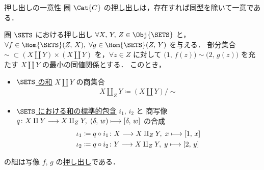 \documentclass[geometry_main]{subfiles}
\begin{document}
\begin{myprop}[]{押し出しの一意性}
	圏 $\Cat{C}$ の\hyperref[def:pushout]{押し出し}は，存在すれば\hyperref[def:iso]{同型}を除いて一意である．
\end{myprop}

\begin{myprop}[label=prop:pushout-sets]{圏 $\SETS$ における押し出し}
	$\forall X,\, Y,\, Z \in \Obj{\SETS}$ と，$\forall f \in \Hom{\SETS}(Z,\, X),\; \forall g \in \Hom{\SETS}(Z,\, Y)$ を与える．
	部分集合 $\sim\; \subset (X \amalg Y) \times (X \amalg Y)$ を，$\forall z \in Z$ に対して $\bigl(1,\, f(z)\bigr) \sim \bigl(2,\, g(z)\bigr)$ を充たす $X \amalg Y$ の最小の同値関係とする．
	このとき，
	\begin{itemize}
		\item \hyperref[prop:sum-sets]{$\SETS$ の和} $X \amalg Y$ の商集合
		\begin{align}
			X \amalg_Z Y \coloneqq (X \amalg Y)/{\sim}
		\end{align}
		\item \hyperref[prop:sum-sets]{$\SETS$ における和の標準的包含} $i_1,\, i_2$ と
		商写像 $q \colon X \amalg Y \longrightarrow X \amalg_Z Y,\; (\delta,\, w) \longmapsto [\delta,\, w]$ の合成
		\begin{align}
			\iota_1 &\coloneqq q \circ i_1 \colon X \longrightarrow X \amalg_Z Y,\; x \longmapsto [1,\, x] \\
			\iota_2 &\coloneqq q \circ i_2 \colon Y \longrightarrow X \amalg_Z Y,\; y \longmapsto [2,\, y]
		\end{align}
	\end{itemize}
	の組は写像 $f,\, g$ の\hyperref[def:pushout]{押し出し}である．
\end{myprop}
\end{document}

